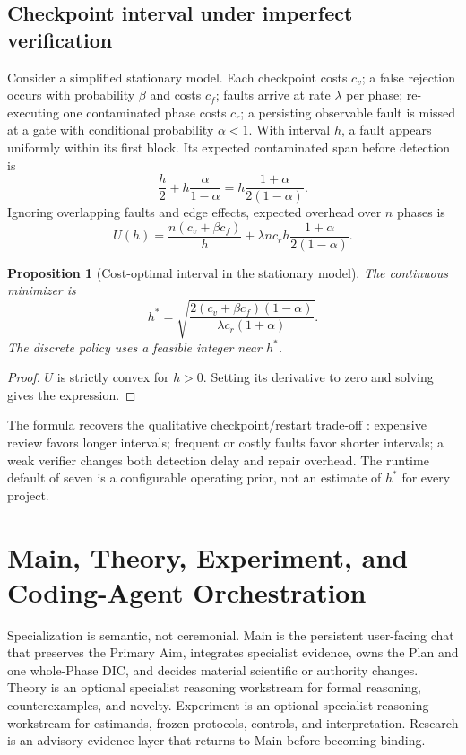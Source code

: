 \documentclass[11pt]{article}
\newtheorem{proposition}[definition]{Proposition}
\begin{document}
\subsection{Checkpoint interval under imperfect verification}
Consider a simplified stationary model. Each checkpoint costs $c_v$; a false rejection occurs with probability $\beta$ and costs $c_f$; faults arrive at rate $\lambda$ per phase; re-executing one contaminated phase costs $c_r$; a persisting observable fault is missed at a gate with conditional probability $\alpha<1$. With interval $h$, a fault appears uniformly within its first block. Its expected contaminated span before detection is
\[
\frac h2+h\frac{\alpha}{1-\alpha}=h\frac{1+\alpha}{2(1-\alpha)}.
\]
Ignoring overlapping faults and edge effects, expected overhead over $n$ phases is
\[
U(h)=\frac{n(c_v+\beta c_f)}{h}+\lambda n c_r h\frac{1+\alpha}{2(1-\alpha)}.
\]
\begin{proposition}[Cost-optimal interval in the stationary model]
\label{prop:hstar}
The continuous minimizer is
\[
h^*=\sqrt{\frac{2(c_v+\beta c_f)(1-\alpha)}{\lambda c_r(1+\alpha)}}.
\]
The discrete policy uses a feasible integer near $h^*$.
\end{proposition}
\begin{proof}
$U$ is strictly convex for $h>0$. Setting its derivative to zero and solving gives the expression.
\end{proof}
The formula recovers the qualitative checkpoint/restart trade-off \citep{young1974first,daly2006higher}: expensive review favors longer intervals; frequent or costly faults favor shorter intervals; a weak verifier changes both detection delay and repair overhead. The runtime default of seven is a configurable operating prior, not an estimate of $h^*$ for every project.

\section{Main, Theory, Experiment, and Coding-Agent Orchestration}
Specialization is semantic, not ceremonial. Main is the persistent user-facing chat that preserves the Primary Aim, integrates specialist evidence, owns the Plan and one whole-Phase DIC, and decides material scientific or authority changes. Theory is an optional specialist reasoning workstream for formal reasoning, counterexamples, and novelty. Experiment is an optional specialist reasoning workstream for estimands, frozen protocols, controls, and interpretation. Research is an advisory evidence layer that returns to Main before becoming binding.
\end{document}
